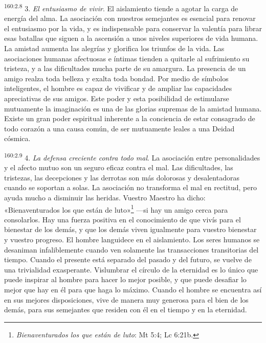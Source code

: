 \par 
\textsuperscript{160:2.8} 3. \textit{El entusiasmo de vivir}. El aislamiento tiende a agotar la carga de energía del alma. La asociación con nuestros semejantes es esencial para renovar el entusiasmo por la vida, y es indispensable para conservar la valentía para librar esas batallas que siguen a la ascensión a unos niveles superiores de vida humana. La amistad aumenta las alegrías y glorifica los triunfos de la vida. Las asociaciones humanas afectuosas e íntimas tienden a quitarle al sufrimiento su tristeza, y a las dificultades mucha parte de su amargura. La presencia de un amigo realza toda belleza y exalta toda bondad. Por medio de símbolos inteligentes, el hombre es capaz de vivificar y de ampliar las capacidades apreciativas de sus amigos. Este poder y esta posibilidad de estimularse mutuamente la imaginación es una de las glorias supremas de la amistad humana. Existe un gran poder espiritual inherente a la conciencia de estar consagrado de todo corazón a una causa común, de ser mutuamente leales a una Deidad cósmica.

\par 
\textsuperscript{160:2.9} 4. \textit{La defensa creciente contra todo mal}. La asociación entre personalidades y el afecto mutuo son un seguro eficaz contra el mal. Las dificultades, las tristezas, las decepciones y las derrotas son más dolorosas y desalentadoras cuando se soportan a solas. La asociación no transforma el mal en rectitud, pero ayuda mucho a disminuir las heridas. Vuestro Maestro ha dicho: «Bienaventurados los que están de luto»\footnote{\textit{Bienaventurados los que están de luto}: Mt 5:4; Lc 6:21b.} ---si hay un amigo cerca para consolarlos. Hay una fuerza positiva en el conocimiento de que vivís para el bienestar de los demás, y que los demás viven igualmente para vuestro bienestar y vuestro progreso. El hombre languidece en el aislamiento. Los seres humanos se desaniman infaliblemente cuando ven solamente las transacciones transitorias del tiempo. Cuando el presente está separado del pasado y del futuro, se vuelve de una trivialidad exasperante. Vislumbrar el círculo de la eternidad es lo único que puede inspirar al hombre para hacer lo mejor posible, y que puede desafiar lo mejor que hay en él para que haga lo máximo. Cuando el hombre se encuentra así en sus mejores disposiciones, vive de manera muy generosa para el bien de los demás, para sus semejantes que residen con él en el tiempo y en la eternidad.

